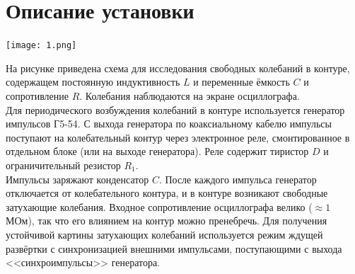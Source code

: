 \documentclass[a4paper,12pt]{report}
\begin{document}
\section*{Описание установки}
\begin{center}
\texttt{[image: 1.png]}
\end{center}
На рисунке приведена схема для исследования свободных колебаний в контуре, содержащем постоянную индуктивность $L$ и переменные ёмкость $C$ и сопротивление $R$. Колебания наблюдаются на экране осциллографа.\\
Для периодического возбуждения колебаний в контуре используется генератор импульсов Г5-54. С выхода генератора по коаксиальному кабелю импульсы поступают на колебательный контур через электронное реле, смонтированное в отдельном блоке (или на выходе генератора). Реле содержит тиристор $D$ и ограничительный резистор $R_1$.\\
Импульсы заряжают конденсатор $C$. После каждого импульса генератор отключается от колебательного контура, и в контуре возникают свободные затухающие колебания. Входное сопротивление осциллографа велико ($\approx 1$ МОм), так что его влиянием на контур можно пренебречь. Для получения устойчивой картины затухающих колебаний используется режим ждущей развёртки с синхронизацией внешними импульсами, поступающими с выхода <<синхроимпульсы>> генератора.
\end{document}
